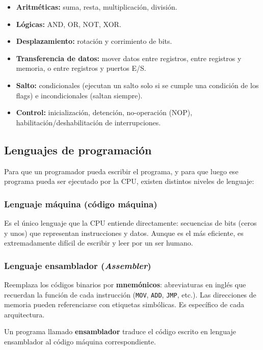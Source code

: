 \begin{itemize}
  \item \textbf{Aritméticas:} suma, resta, multiplicación, división.
  \item \textbf{Lógicas:} AND, OR, NOT, XOR.
  \item \textbf{Desplazamiento:} rotación y corrimiento de bits.
  \item \textbf{Transferencia de datos:} mover datos entre registros, entre registros y memoria, o entre registros y puertos E/S.
  \item \textbf{Salto:} condicionales (ejecutan un salto solo si se cumple una condición de los flags) e incondicionales (saltan siempre).
  \item \textbf{Control:} inicialización, detención, no-operación (NOP), habilitación/deshabilitación de interrupciones.
\end{itemize}

\subsection{Lenguajes de programación}

Para que un programador pueda escribir el programa, y para que luego ese programa pueda ser ejecutado por la CPU, existen distintos niveles de lenguaje:

\subsubsection{Lenguaje máquina (código máquina)}

Es el único lenguaje que la CPU entiende directamente: secuencias de bits (ceros y unos) que representan instrucciones y datos. Aunque es el más eficiente, es extremadamente difícil de escribir y leer por un ser humano.

\subsubsection{Lenguaje ensamblador (\textit{Assembler})}

Reemplaza los códigos binarios por \textbf{mnemónicos}: abreviaturas en inglés que recuerdan la función de cada instrucción (\texttt{MOV}, \texttt{ADD}, \texttt{JMP}, etc.). Las direcciones de memoria pueden referenciarse con etiquetas simbólicas. Es específico de cada arquitectura.

Un programa llamado \textbf{ensamblador} traduce el código escrito en lenguaje ensamblador al código máquina correspondiente.


